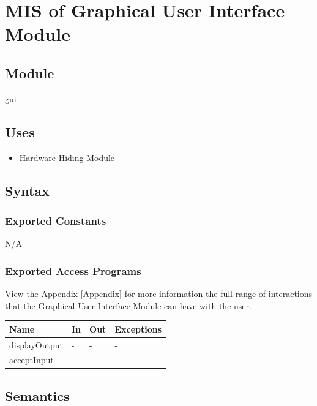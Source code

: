 \documentclass[12pt, titlepage]{article}
\begin{document}
\newpage
\section{MIS of Graphical User Interface Module} \label{MGUI}

\subsection{Module}

gui
\subsection{Uses}

\begin{itemize}
  \item Hardware-Hiding Module
\end{itemize}

\subsection{Syntax}

\subsubsection{Exported Constants}

N/A

\subsubsection{Exported Access Programs}


View the Appendix \ref{Appendix} for more information the full range of
interactions that the Graphical User Interface Module can have with the user.

\begin{center}
\begin{tabular}{p{4cm} p{4cm} p{4cm} p{2cm}}
\hline
\textbf{Name} & \textbf{In} & \textbf{Out} & \textbf{Exceptions} \\
\hline
displayOutput & - & - & - \\
acceptInput & - & - & - \\
\hline
\end{tabular}
\end{center}

\subsection{Semantics}
\end{document}
